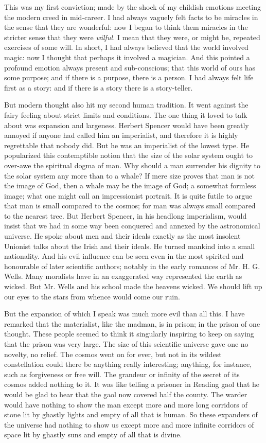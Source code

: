 \documentclass{book}
\begin{document}
This was my first conviction; made by the shock of my childish emotions meeting the modern creed in mid-career. I had always vaguely felt facts to be miracles in the sense that they are wonderful: now I began to think them miracles in the stricter sense that they were \emph{wilful.} I mean that they were, or might be, repeated exercises of some will. In short, I had always believed that the world involved magic: now I thought that perhaps it involved a magician. And this pointed a profound emotion always present and sub-conscious; that this world of ours has some purpose; and if there is a purpose, there is a person. I had always felt life first as a story: and if there is a story there is a story-teller.

But modern thought also hit my second human tradition. It went against the fairy feeling about strict limits and conditions. The one thing it loved to talk about was expansion and largeness. Herbert Spencer would have been greatly annoyed if anyone had called him an imperialist, and therefore it is highly regrettable that nobody did. But he was an imperialist of the lowest type. He popularized this contemptible notion that the size of the solar system ought to over-awe the spiritual dogma of man. Why should a man surrender his dignity to the solar system any more than to a whale? If mere size proves that man is not the image of God, then a whale may be the image of God; a somewhat formless image; what one might call an impressionist portrait. It is quite futile to argue that man is small compared to the cosmos; for man was always small compared to the nearest tree. But Herbert Spencer, in his headlong imperialism, would insist that we had in some way been conquered and annexed by the astronomical universe. He spoke about men and their ideals exactly as the most insolent Unionist talks about the Irish and their ideals. He turned mankind into a small nationality. And his evil influence can be seen even in the most spirited and honourable of later scientific authors; notably in the early romances of Mr. H. G. Wells. Many moralists have in an exaggerated way represented the earth as wicked. But Mr. Wells and his school made the heavens wicked. We should lift up our eyes to the stars from whence would come our ruin.

But the expansion of which I speak was much more evil than all this. I have remarked that the materialist, like the madman, is in prison; in the prison of one thought. These people seemed to think it singularly inspiring to keep on saying that the prison was very large. The size of this scientific universe gave one no novelty, no relief. The cosmos went on for ever, but not in its wildest constellation could there be anything really interesting; anything, for instance, such as forgiveness or free will. The grandeur or infinity of the secret of its cosmos added nothing to it. It was like telling a prisoner in Reading gaol that he would be glad to hear that the gaol now covered half the county. The warder would have nothing to show the man except more and more long corridors of stone lit by ghastly lights and empty of all that is human. So these expanders of the universe had nothing to show us except more and more infinite corridors of space lit by ghastly suns and empty of all that is divine.
\end{document}
